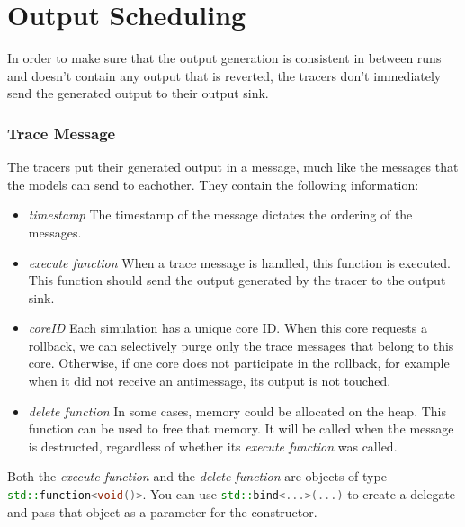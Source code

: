 \documentclass[12pt]{article}
\newcommand{\inlinecpp}[1]{\lstinline[language=c++]{#1}}
\begin{document}
\part*{Output Scheduling}
In order to make sure that the output generation is consistent in between runs and doesn't contain any output that is reverted, the tracers don't immediately send the generated output to their output sink.
\section{Trace Message}
The tracers put their generated output in a message, much like the messages that the models can send to eachother. They contain the following information:
\begin{itemize}
	\item \emph{timestamp} The timestamp of the message dictates the ordering of the messages.
	\item \emph{execute function} When a trace message is handled, this function is executed. This function should send the output generated by the tracer to the output sink.
	\item \emph{coreID} Each simulation has a unique core ID. When this core requests a rollback, we can selectively purge only the trace messages that belong to this core. Otherwise, if one core does not participate in the rollback, for example when it did not receive an antimessage, its output is not touched.
	\item \emph{delete function} In some cases, memory could be allocated on the heap. This function can be used to free that memory. It will be called when the message is destructed, regardless of whether its \emph{execute function} was called.
\end{itemize}
Both the \emph{execute function} and the \emph{delete function} are objects of type \inlinecpp{std::function<void()>}. You can use \inlinecpp{std::bind<...>(...)} to create a delegate and pass that object as a parameter for the constructor.
\end{document}
